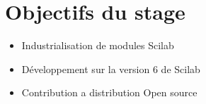 \section*{Objectifs du stage}

\begin{itemize}
\item Industrialisation de modules Scilab
\item Développement sur la version 6 de Scilab
\item Contribution a distribution Open source
\end{itemize}

